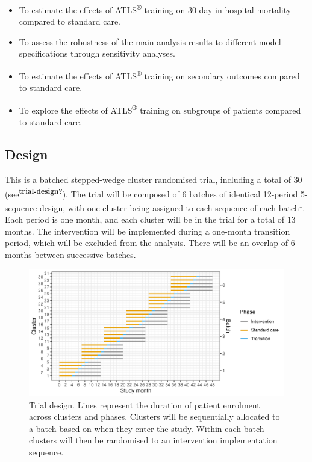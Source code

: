 \documentclass[
]{scrartcl}
\providecommand{\tightlist}{%
  \setlength{\itemsep}{0pt}\setlength{\parskip}{0pt}}\usepackage{longtable,booktabs,array}
\begin{document}
\begin{itemize}
\tightlist
\item
  To estimate the effects of ATLS\textsuperscript{®} training on 30-day
  in-hospital mortality compared to standard care.
\item
  To assess the robustness of the main analysis results to different
  model specifications through sensitivity analyses.
\item
  To estimate the effects of ATLS\textsuperscript{®} training on
  secondary outcomes compared to standard care.
\item
  To explore the effects of ATLS\textsuperscript{®} training on
  subgroups of patients compared to standard care.
\end{itemize}

\hypertarget{design}{%
\subsection{Design}\label{design}}

This is a batched stepped-wedge cluster randomised trial, including a
total of 30 (see\textsuperscript{\textbf{trial-design?}}). The trial
will be composed of 6 batches of identical 12-period 5-sequence design,
with one cluster being assigned to each sequence of each
batch\textsuperscript{1}. Each period is one month, and each cluster
will be in the trial for a total of 13 months. The intervention will be
implemented during a one-month transition period, which will be excluded
from the analysis. There will be an overlap of 6 months between
successive batches.

\begin{figure}

{\centering \includegraphics{trial-design-figure-30-clusters-5-sequences-6-batches-6-batches-overlap-4-min-standard-care-4-min-intervention-1-transition-months-0-transition-overlap.png}

}

\caption{\label{fig-trial-design}Trial design. Lines represent the
duration of patient enrolment across clusters and phases. Clusters will
be sequentially allocated to a batch based on when they enter the study.
Within each batch clusters will then be randomised to an intervention
implementation sequence.}

\end{figure}
\end{document}
